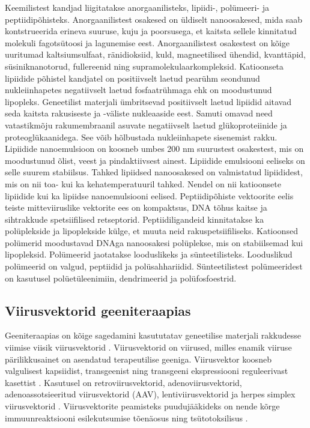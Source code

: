 \documentclass{trkut}%
\begin{document}
Keemilistest kandjad liigitatakse anorgaanilisteks, lipiidi-, polümeeri- ja peptiidipõhisteks. Anorgaanilistest osakesed on üldiselt nanoosakesed, mida saab kontstrueerida erineva suuruse, kuju ja poorsusega, et kaitsta sellele kinnitatud molekuli fagotsütoosi ja lagunemise eest. Anorgaanilistest osakestest on kõige uuritumad kaltsiumsulfaat, ränidioksiid, kuld, magneetilised ühendid, kvanttäpid, süsiniknanotorud, fullereenid ning supramolekulaarkompleksid. Katioonseta lipiidide põhistel kandjatel on positiivselt laetud pearühm seondunud nukleiinhapetes negatiivselt laetud fosfaatrühmaga ehk on moodustunud lipopleks. Geneetilist materjali ümbritsevad positiivselt laetud lipiidid aitavad seda kaitsta rakusiseste ja -väliste nukleaaside eest. Samuti omavad need vatastikmõju rakumembraanil asuvate negatiivselt laetud glükoproteiinide ja proteoglükaanidega. See võib hõlbustada nukleiinhapete sisenemist rakku. Lipiidide nanoemulsioon on koosneb umbes 200 nm suurustest osakestest, mis on moodustunud õlist, veest ja pindaktiivsest ainest. Lipiidide emulsiooni eeliseks on selle suurem stabiilsus. Tahked lipiidsed nanoosakesed on valmistatud lipiididest, mis on nii toa- kui ka kehatemperatuuril tahked. Nendel on nii katioonsete lipiidide kui ka lipiidse nanoemulsiooni eelised. Peptiidipõhiste vektoorite eelis teiste mitteviiruslike vektorite ees on kompaktsus, DNA tõhus kaitse ja sihtrakkude spetsiifilised retseptorid. Peptiidiligandeid kinnitatakse ka polüplekside ja lipoplekside külge, et muuta neid rakuspetsiifiliseks.  Katioonsed polümerid moodustavad DNAga nanoosakesi polüplekse, mis on stabiilsemad kui lipopleksid. Polümeerid
jaotatakse looduslikeks ja sünteetilisteks. Looduslikud polümeerid on valgud, peptiidid ja polüsahhariidid. Sünteetilistest polümeeridest on kasutusel polüetüleenimiin, dendrimeerid ja polüfosfoestrid. \parencite{genviisid}

\subsection{Viirusvektorid geeniteraapias}

Geeniteraapias on kõige sagedamini kasututatav geneetilise materjali rakkudesse viimise viisik viirusvektorid \parencite{viirusvektorid}. Viirusvektorid on viirused, milles enamik viiruse pärilikkusainet on asendatud terapeutilise geeniga. Viirusvektor koosneb valgulisest kapsiidist, transgeenist ning  transgeeni ekspressiooni reguleerivast kasettist \parencite{vvkoostis}. Kasutusel on retroviirusvektorid, adenoviirusvektorid, adenoassotsieeritud
viirusvektorid (AAV), lentiviirusvektorid ja herpes simplex viirusvektorid \parencite{viirusvektorid}. Viirusvektorite peamisteks puudujääkideks on nende kõrge immuunreaktsiooni esilekutsumise tõenäosus ning tsütotoksilisus \parencite{genviisid}. 
\end{document}
